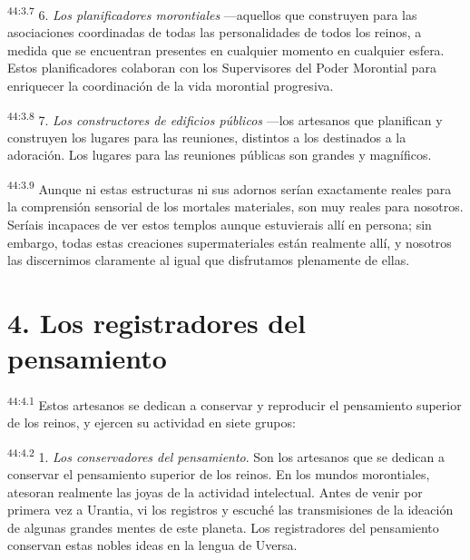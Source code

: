 \par
\textsuperscript{44:3.7} 6. \textit{Los planificadores morontiales} ---aquellos que construyen para las asociaciones coordinadas de todas las personalidades de todos los reinos, a medida que se encuentran presentes en cualquier momento en cualquier esfera. Estos planificadores colaboran con los Supervisores del Poder Morontial para enriquecer la coordinación de la vida morontial progresiva.

\par
\textsuperscript{44:3.8} 7. \textit{Los constructores de edificios públicos} ---los artesanos que planifican y construyen los lugares para las reuniones, distintos a los destinados a la adoración. Los lugares para las reuniones públicas son grandes y magníficos.

\par
\textsuperscript{44:3.9} Aunque ni estas estructuras ni sus adornos serían exactamente reales para la comprensión sensorial de los mortales materiales, son muy reales para nosotros. Seríais incapaces de ver estos templos aunque estuvierais allí en persona; sin embargo, todas estas creaciones supermateriales están realmente allí, y nosotros las discernimos claramente al igual que disfrutamos plenamente de ellas.

\section*{4. Los registradores del pensamiento}
\par
\textsuperscript{44:4.1} Estos artesanos se dedican a conservar y reproducir el pensamiento superior de los reinos, y ejercen su actividad en siete grupos:

\par
\textsuperscript{44:4.2} 1. \textit{Los conservadores del pensamiento}. Son los artesanos que se dedican a conservar el pensamiento superior de los reinos. En los mundos morontiales, atesoran realmente las joyas de la actividad intelectual. Antes de venir por primera vez a Urantia, vi los registros y escuché las transmisiones de la ideación de algunas grandes mentes de este planeta. Los registradores del pensamiento conservan estas nobles ideas en la lengua de Uversa.

